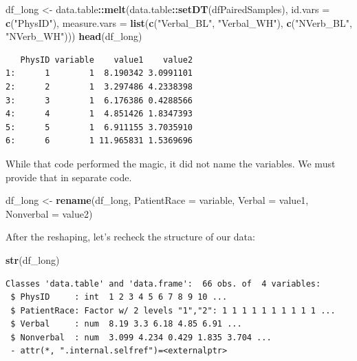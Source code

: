 \documentclass[
  11pt,
]{book}
\newenvironment{Shaded}{\begin{snugshade}}{\end{snugshade}}
\newcommand{\AttributeTok}[1]{\textcolor[rgb]{0.27,0.27,0.27}{#1}}
\newcommand{\FunctionTok}[1]{\textcolor[rgb]{0.27,0.27,0.27}{\textbf{#1}}}
\newcommand{\NormalTok}[1]{#1}
\newcommand{\OtherTok}[1]{\textcolor[rgb]{0.37,0.37,0.37}{#1}}
\newcommand{\SpecialCharTok}[1]{\textcolor[rgb]{0.43,0.43,0.43}{\textbf{#1}}}
\newcommand{\StringTok}[1]{\textcolor[rgb]{0.5,0.5,0.5}{#1}}
\begin{document}
\begin{Shaded}
\begin{Highlighting}[]
\NormalTok{df\_long }\OtherTok{\textless{}{-}}\NormalTok{ data.table}\SpecialCharTok{::}\FunctionTok{melt}\NormalTok{(data.table}\SpecialCharTok{::}\FunctionTok{setDT}\NormalTok{(dfPairedSamples), }\AttributeTok{id.vars =} \FunctionTok{c}\NormalTok{(}\StringTok{"PhysID"}\NormalTok{),}
    \AttributeTok{measure.vars =} \FunctionTok{list}\NormalTok{(}\FunctionTok{c}\NormalTok{(}\StringTok{"Verbal\_BL"}\NormalTok{, }\StringTok{"Verbal\_WH"}\NormalTok{), }\FunctionTok{c}\NormalTok{(}\StringTok{"NVerb\_BL"}\NormalTok{, }\StringTok{"NVerb\_WH"}\NormalTok{)))}
\FunctionTok{head}\NormalTok{(df\_long)}
\end{Highlighting}
\end{Shaded}

\begin{verbatim}
   PhysID variable    value1    value2
1:      1        1  8.190342 3.0991101
2:      2        1  3.297486 4.2338398
3:      3        1  6.176386 0.4288566
4:      4        1  4.851426 1.8347393
5:      5        1  6.911155 3.7035910
6:      6        1 11.965831 1.5369696
\end{verbatim}

While that code performed the magic, it did not name the variables. We must provide that in separate code.

\begin{Shaded}
\begin{Highlighting}[]
\NormalTok{df\_long }\OtherTok{\textless{}{-}} \FunctionTok{rename}\NormalTok{(df\_long, }\AttributeTok{PatientRace =}\NormalTok{ variable, }\AttributeTok{Verbal =}\NormalTok{ value1, }\AttributeTok{Nonverbal =}\NormalTok{ value2)}
\end{Highlighting}
\end{Shaded}

After the reshaping, let's recheck the structure of our data:

\begin{Shaded}
\begin{Highlighting}[]
\FunctionTok{str}\NormalTok{(df\_long)}
\end{Highlighting}
\end{Shaded}

\begin{verbatim}
Classes 'data.table' and 'data.frame':  66 obs. of  4 variables:
 $ PhysID     : int  1 2 3 4 5 6 7 8 9 10 ...
 $ PatientRace: Factor w/ 2 levels "1","2": 1 1 1 1 1 1 1 1 1 1 ...
 $ Verbal     : num  8.19 3.3 6.18 4.85 6.91 ...
 $ Nonverbal  : num  3.099 4.234 0.429 1.835 3.704 ...
 - attr(*, ".internal.selfref")=<externalptr> 
\end{verbatim}
\end{document}
